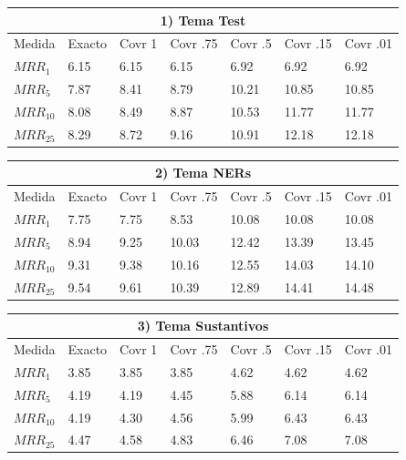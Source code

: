\begin{table}[H]
\centering
\begin{center}
\begin{tabular}{|l | l | l | l | l | l | l |}
\hline
\multicolumn{7}{|c|}{1) Tema Test}  \\ \hline
Medida & Exacto & Covr 1 & Covr .75 & Covr .5 & Covr .15 & Covr .01 \\ \hline
$MRR_{1}$ & 6.15 & 6.15 & 6.15 & 6.92 & 6.92 & 6.92  \\ \hline
$MRR_{5}$ & 7.87 & 8.41 & 8.79 & 10.21 & 10.85 & 10.85  \\ \hline
$MRR_{10}$ & 8.08 & 8.49 & 8.87 & 10.53 & 11.77 & 11.77  \\ \hline
$MRR_{25}$ & 8.29 & 8.72 & 9.16 & 10.91 & 12.18 & 12.18  \\ \hline
\end{tabular}

\medskip

\begin{tabular}{|l | l | l | l | l | l | l |}
\hline
\multicolumn{7}{|c|}{2) Tema NERs}  \\ \hline
Medida & Exacto & Covr 1 & Covr .75 & Covr .5 & Covr .15 & Covr .01 \\ \hline
$MRR_{1}$ & 7.75 & 7.75 & 8.53 & 10.08 & 10.08 & 10.08  \\ \hline
$MRR_{5}$ & 8.94 & 9.25 & 10.03 & 12.42 & 13.39 & 13.45  \\ \hline
$MRR_{10}$ & 9.31 & 9.38 & 10.16 & 12.55 & 14.03 & 14.10  \\ \hline
$MRR_{25}$ & 9.54 & 9.61 & 10.39 & 12.89 & 14.41 & 14.48  \\ \hline
\end{tabular}

\medskip


\begin{tabular}{|l | l | l | l | l | l | l |}
\hline
\multicolumn{7}{|c|}{3) Tema Sustantivos}  \\ \hline
Medida & Exacto & Covr 1 & Covr .75 & Covr .5 & Covr .15 & Covr .01 \\ \hline
$MRR_{1}$ & 3.85 & 3.85 & 3.85 & 4.62 & 4.62 & 4.62  \\ \hline
$MRR_{5}$ & 4.19 & 4.19 & 4.45 & 5.88 & 6.14 & 6.14  \\ \hline
$MRR_{10}$ & 4.19 & 4.30 & 4.56 & 5.99 & 6.43 & 6.43  \\ \hline
$MRR_{25}$ & 4.47 & 4.58 & 4.83 & 6.46 & 7.08 & 7.08  \\ \hline
\end{tabular}


\end{center}
\end{table}

